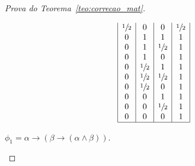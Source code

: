 \begin{proof}[Prova do Teorema~\ref{teo:correcao_mat}]
\begin{provaporcasos}
\begin{provaporsubcasos}
\begin{center}
\[\begin{array}{|c|c|c|c|}
                                    \meio{} & 0           & 0           & \meio{} \\
                                    0           & 1           & 1           & 1 \\
                                    0           & 1           & \meio{} & 1 \\
                                    0           & 1           & 0           & 1 \\
                                    0           & \meio{} & 1           & 1 \\
                                    0           & \meio{} & \meio{} & 1 \\
                                    0           & \meio{} & 0           & 1 \\
                                    0           & 0           & 1           & 1 \\
                                    0           & 0           & \meio{} & 1 \\
                                    0           & 0           & 0           & 1 \\
                                    \hline%
                                \end{array}
                            \]
                        \end{center}
                    

                    \subcasodeprova{} $\phi_{1} = \alpha \to (\beta \to (\alpha \land \beta))$. 


\end{provaporsubcasos}
\end{provaporcasos}
\end{proof}
